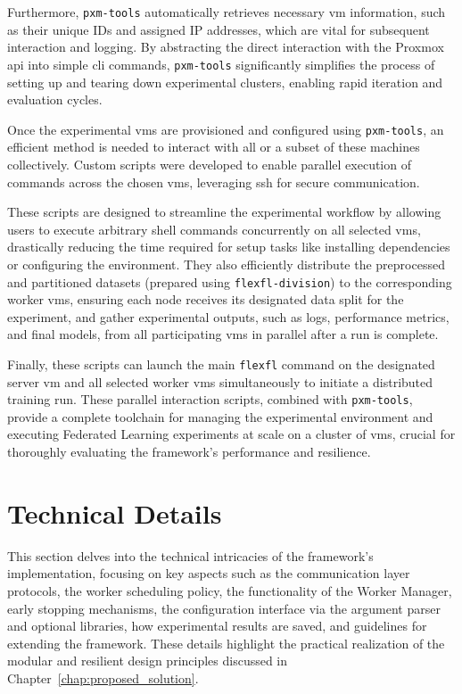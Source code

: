 Furthermore, \texttt{pxm-tools} automatically retrieves necessary \ac{vm} information, such as their unique IDs and assigned IP addresses, which are vital for subsequent interaction and logging. By abstracting the direct interaction with the Proxmox \ac{api} into simple \ac{cli} commands, \texttt{pxm-tools} significantly simplifies the process of setting up and tearing down experimental clusters, enabling rapid iteration and evaluation cycles.

Once the experimental \acp{vm} are provisioned and configured using \texttt{pxm-tools}, an efficient method is needed to interact with all or a subset of these machines collectively. Custom scripts were developed to enable parallel execution of commands across the chosen \acp{vm}, leveraging \ac{ssh} for secure communication. 

These scripts are designed to streamline the experimental workflow by allowing users to execute arbitrary shell commands concurrently on all selected \acp{vm}, drastically reducing the time required for setup tasks like installing dependencies or configuring the environment. They also efficiently distribute the preprocessed and partitioned datasets (prepared using \texttt{flexfl-division}) to the corresponding worker \acp{vm}, ensuring each node receives its designated data split for the experiment, and gather experimental outputs, such as logs, performance metrics, and final models, from all participating \acp{vm} in parallel after a run is complete. 

Finally, these scripts can launch the main \texttt{flexfl} command on the designated server \ac{vm} and all selected worker \acp{vm} simultaneously to initiate a distributed training run. These parallel interaction scripts, combined with \texttt{pxm-tools}, provide a complete toolchain for managing the experimental environment and executing Federated Learning experiments at scale on a cluster of \acp{vm}, crucial for thoroughly evaluating the framework's performance and resilience.



\section{Technical Details}
\label{sec:technical-details}

This section delves into the technical intricacies of the framework's implementation, focusing on key aspects such as the communication layer protocols, the worker scheduling policy, the functionality of the Worker Manager, early stopping mechanisms, the configuration interface via the argument parser and optional libraries, how experimental results are saved, and guidelines for extending the framework. These details highlight the practical realization of the modular and resilient design principles discussed in Chapter~\ref{chap:proposed_solution}.

